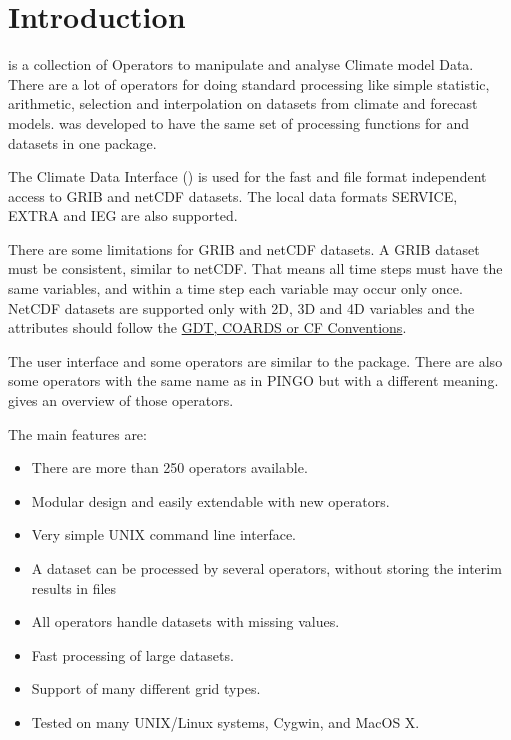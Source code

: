 \chapter{Introduction}

\CDO is a collection of Operators to manipulate and analyse Climate model Data.
There are a lot of operators for doing standard processing like simple statistic,
arithmetic, selection and interpolation on datasets from climate and forecast models.
\CDO was developed to have the same set of processing functions for  and 
datasets in one package.

The Climate Data Interface () is used for the fast and file format
independent access to GRIB and netCDF datasets.
The local data formats SERVICE, EXTRA and IEG are also supported.

There are some limitations for GRIB and netCDF datasets.
A GRIB dataset must be consistent, similar to netCDF.
That means all time steps must have the same variables, and
within a time step each variable may occur only once.
NetCDF datasets are supported only with 2D, 3D and 4D variables and the attributes should follow the
\href{http://ftp.unidata.ucar.edu/software/netcdf/docs/conventions.html}
     {GDT, COARDS or CF Conventions}.

The user interface and some operators are similar to the  package.
There are also some operators with the same name as in PINGO but with a 
different meaning.  gives an overview of 
those operators.

The main \CDO features are:
\begin{itemize}
\item There are more than 250 operators available.
\item Modular design and easily extendable with new operators.
\item Very simple UNIX command line interface.
\item A dataset can be processed by several operators,
      without storing the interim results in files %
\item All operators handle datasets with missing values.
\item Fast processing of large datasets.
\item Support of many different grid types.
\item Tested on many UNIX/Linux systems, Cygwin, and MacOS X.
\end{itemize}












